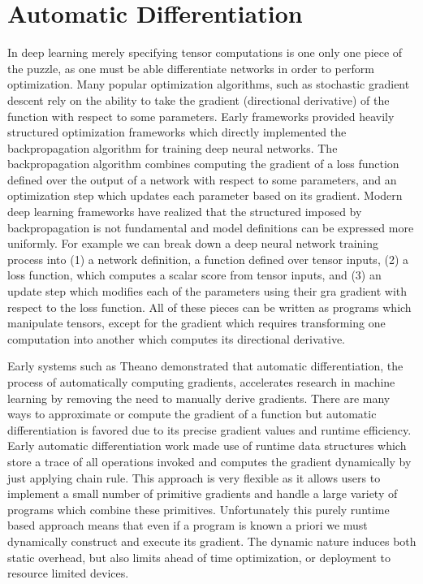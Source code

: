 \chapter{Automatic Differentiation}
\label{ch:ad}

In deep learning merely specifying tensor computations is
  one only one piece of the puzzle, as one must be able
  differentiate networks in order to perform optimization.
Many popular optimization algorithms,
  such as stochastic gradient descent
  rely on the ability to take
  the gradient (directional derivative) of the function with
  respect to some parameters.
Early frameworks provided heavily structured optimization frameworks
  which directly implemented the backpropagation algorithm for training
  deep neural networks.
The backpropagation algorithm combines
  computing the gradient of a loss function defined over the
  output of a network with respect to some parameters, and an
  optimization step which updates each parameter based on its
  gradient.
Modern deep learning frameworks have realized that the
  structured imposed by backpropagation is not fundamental
  and model definitions can be expressed more uniformly.
For example we can break down a deep neural network training
  process into (1) a network definition, a function defined over tensor inputs,
  (2) a loss function, which computes a scalar score from tensor
  inputs, and (3) an update step which modifies each of the parameters using their gra
  gradient with respect to the loss function.
All of these pieces can be written as programs which manipulate tensors,
  except for the gradient which requires transforming
  one computation into another which computes its directional derivative.

Early systems such as Theano demonstrated that automatic
  differentiation, the process of automatically computing gradients,
  accelerates research in machine learning by removing the need to manually
  derive gradients.
There are many ways to approximate or compute the gradient of a function
  but automatic differentiation is favored due to its precise gradient
  values and runtime efficiency.
Early automatic differentiation work made use of runtime data structures
  which store a trace of all operations invoked and computes the gradient
  dynamically by just applying chain rule.
This approach is very flexible as it allows users to implement a small number
  of primitive gradients and handle a large variety of programs which combine
  these primitives.
Unfortunately this purely runtime based approach means that even if a program
  is known a priori we must dynamically construct and execute its gradient.
The dynamic nature induces both static overhead, but also limits ahead of time
  optimization, or deployment to resource limited devices.

